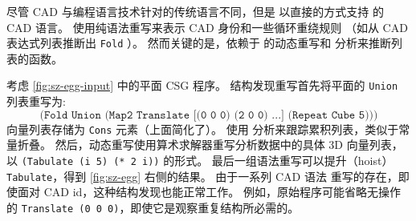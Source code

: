 尽管 CAD 与编程语言技术针对的传统语言不同，但是 \egg 以直接的方式支持 \sz 的 CAD 语言。
\sz 使用纯语法重写来表示 CAD 身份和一些循环重绕规则
  （如从 CAD 表达式列表推断出 \texttt{Fold} ）。
然而关键的是，\sz 依赖于 \egg 的动态重写和 \eclass 分析来推断列表的函数。

考虑 \autoref{fig:sz-egg-input} 中的平面 CSG 程序。
结构发现重写首先将平面的 \texttt{Union} 列表重写为:
$$\texttt{(Fold Union (Map2 Translate [(0 0 0) (2 0 0) ...] (Repeat Cube 5)))}$$
向量列表存储为 \texttt{Cons} 元素（上面简化了）。
\sz 使用 \eclass 分析来跟踪累积列表，类似于常量折叠。
然后，动态重写使用算术求解器重写分析数据中的具体 3D 向量列表，
  以 \mbox{\texttt{(Tabulate (i 5) (* 2 i))}} 的形式。
最后一组语法重写可以提升（hoist） \texttt{Tabulate}，得到 \autoref{fig:sz-egg} 右侧的结果。
由于一系列 CAD 语法 重写的存在，即使面对 CAD id，这种结构发现也能正常工作。
例如，原始程序可能省略无操作的 \texttt{Translate (0 0 0)}，即使它是观察重复结构所必需的。


